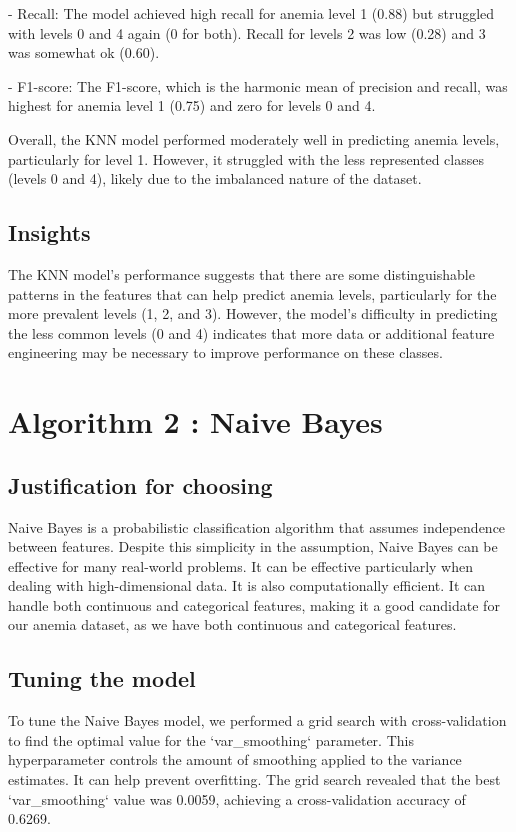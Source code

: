 - Recall: The model achieved high recall for anemia level 1 (0.88) but struggled with levels 0 and 4 again (0 for both). Recall for levels 2 was low (0.28) and 3 was somewhat ok (0.60).


- F1-score: The F1-score, which is the harmonic mean of precision and recall, was highest for anemia level 1 (0.75) and zero for levels 0 and 4.

Overall, the KNN model performed moderately well in predicting anemia levels, particularly for level 1. However, it struggled with the less represented classes (levels 0 and 4), likely due to the imbalanced nature of the dataset.

\subsection{Insights}

The KNN model's performance suggests that there are some distinguishable patterns in the features that can help predict anemia levels, particularly for the more prevalent levels (1, 2, and 3). However, the model's difficulty in predicting the less common levels (0 and 4) indicates that more data or additional feature engineering may be necessary to improve performance on these classes.

\section{Algorithm 2 : Naive Bayes}

\subsection{Justification for choosing}

Naive Bayes is a probabilistic classification algorithm that assumes independence between features. Despite this simplicity in the assumption, Naive Bayes can be effective for many real-world problems. It can be effective particularly when dealing with high-dimensional data. It is also computationally efficient. It can handle both continuous and categorical features, making it a good candidate for our anemia dataset, as we have both continuous and categorical features.

\subsection{Tuning the model}

To tune the Naive Bayes model, we performed a grid search with cross-validation to find the optimal value for the `var\_smoothing` parameter. This hyperparameter controls the amount of smoothing applied to the variance estimates. It can help prevent overfitting. The grid search revealed that the best `var\_smoothing` value was 0.0059, achieving a cross-validation accuracy of 0.6269.

